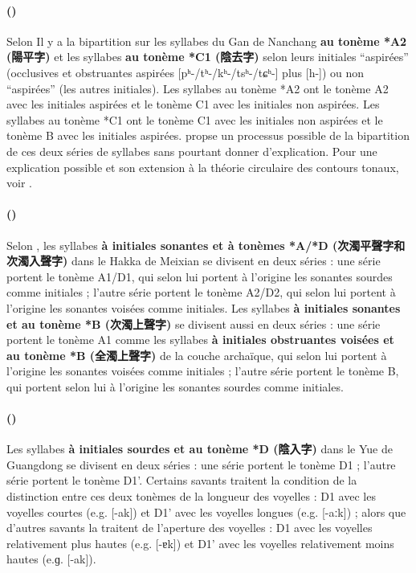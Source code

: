 \documentclass{scrbook}
\newcounter{c}[subsubsection]
\newcommand{\stpc}[1]{\stepcounter{#1}}
\newcommand{\termyyx}[1]{\textbf{#1}}
\begin{document}
\begin{sloppypar}
\stpc{c}\paragraph{()}
Selon \textcite[15]{Xiong1995Nanchang} Il y a la bipartition sur les syllabes du Gan de Nanchang \termyyx{au tonème *A2 (陽平字)} et les syllabes \termyyx{au tonème *C1 (陰去字)} selon leurs initiales ``aspirées'' (occlusives et obstruantes aspirées [pʰ-/tʰ-/kʰ-/tsʰ-/tɕʰ-] plus [h-]) ou non ``aspirées'' (les autres initiales). Les syllabes au tonème *A2 ont le tonème A2 avec les initiales aspirées et le tonème C1 avec les initiales non aspirées. Les syllabes au tonème *C1 ont le tonème C1 avec les initiales non aspirées et le tonème B avec les initiales aspirées. \textcite[279--280]{Xiong1979nanchang} propse un processus possible de la bipartition de ces deux séries de syllabes sans pourtant donner d'explication. Pour une explication possible et son extension à la théorie circulaire des contours tonaux, voir \textcite[109--117]{Sagart1993gan}.

\stpc{c}\paragraph{()}
Selon \textcite[347--354]{Norman2003kejia}, les syllabes \termyyx{à initiales sonantes et à tonèmes *A/*D (次濁平聲字和次濁入聲字)} dans le Hakka de Meixian se divisent en deux séries : une série portent le tonème A1/D1, qui selon lui portent à l'origine les sonantes sourdes comme initiales ; l'autre série portent le tonème A2/D2, qui selon lui portent à l'origine les sonantes voisées comme initiales. Les syllabes \termyyx{à initiales sonantes et au tonème *B (次濁上聲字)} se divisent aussi en deux séries : une série portent le tonème A1 comme les syllabes \termyyx{à initiales obstruantes voisées et au tonème *B (全濁上聲字)} de la couche archaïque, qui selon lui portent à l'origine les sonantes voisées comme initiales ; l'autre série portent le tonème B, qui portent selon lui à l'origine les sonantes sourdes comme initiales.

\stpc{c}\paragraph{()}
Les syllabes \termyyx{à initiales sourdes et au tonème *D (陰入字)} dans le Yue de Guangdong se divisent en deux séries : une série portent le tonème D1 ; l'autre série portent le tonème D1'. Certains savants traitent la condition de la distinction entre ces deux tonèmes de la longueur des voyelles : D1 avec les voyelles courtes (e.g. [-ak]) et D1' avec les voyelles longues (e.g. [-aːk]) ; alors que d'autres savants la traitent de l'aperture des voyelles : D1 avec les voyelles relativement plus hautes (e.g. [-ɐk]) et D1' avec les voyelles relativement moins hautes (e.ɡ. [-ak]). 


\end{sloppypar}
\end{document}
